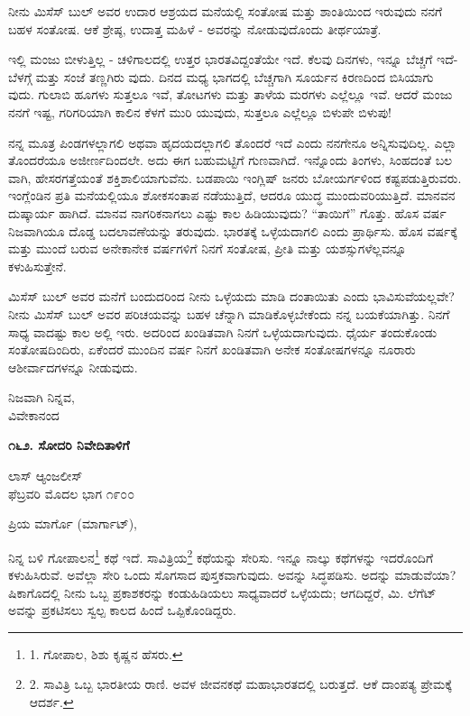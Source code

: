 ನೀನು ಮಿಸೆಸ್ ಬುಲ್ ಅವರ ಉದಾರ ಆಶ್ರಯದ ಮನೆಯಲ್ಲಿ ಸಂತೋಷ ಮತ್ತು ಶಾಂತಿಯಿಂದ ಇರುವುದು ನನಗೆ ಬಹಳ ಸಂತೋಷ. ಆಕೆ ಶ್ರೇಷ್ಠ, ಉದಾತ್ತ ಮಹಿಳೆ - ಅವರನ್ನು ನೋಡುವುದೊಂದು ತೀರ್ಥಯಾತ್ರೆ.

ಇಲ್ಲಿ ಮಂಜು ಬೀಳುತ್ತಿಲ್ಲ - ಚಳಿಗಾಲದಲ್ಲಿ ಉತ್ತರ ಭಾರತವಿದ್ದಂತೆಯೇ ಇದೆ. ಕೆಲವು ದಿನಗಳು, ಇನ್ನೂ ಬೆಚ್ಚಗೆ ಇದೆ-ಬೆಳಗ್ಗೆ ಮತ್ತು ಸಂಜೆ ತಣ್ಣಗಿರು ವುದು. ದಿನದ ಮಧ್ಯ ಭಾಗದಲ್ಲಿ ಬೆಚ್ಚಗಾಗಿ ಸೂರ್ಯನ ಕಿರಣದಿಂದ ಬಿಸಿಯಾಗು ವುದು. ಗುಲಾಬಿ ಹೂಗಳು ಸುತ್ತಲೂ ಇವೆ, ತೋಟಗಳು ಮತ್ತು ತಾಳೆಯ ಮರಗಳು ಎಲ್ಲೆಲ್ಲೂ ಇವೆ. ಆದರೆ ಮಂಜು ನನಗೆ ಇಷ್ಟ, ಗರಿಗರಿಯಾಗಿ ಕಾಲಿನ ಕೆಳಗೆ ಮುರಿ ಯುವುದು, ಸುತ್ತಲೂ ಎಲ್ಲೆಲ್ಲೂ ಬಿಳುಪೇ ಬಿಳುಪು!

ನನ್ನ ಮೂತ್ರ ಪಿಂಡಗಳಲ್ಲಾಗಲಿ ಅಥವಾ ಹೃದಯದಲ್ಲಾಗಲಿ ತೊಂದರೆ ಇದೆ ಎಂದು ನನಗೇನೂ ಅನ್ನಿಸುವುದಿಲ್ಲ. ಎಲ್ಲಾ ತೊಂದರೆಯೂ ಅಜೀರ್ಣದಿಂದಲೇ. ಅದು ಈಗ ಬಹುಮಟ್ಟಿಗೆ ಗುಣವಾಗಿದೆ. ಇನ್ನೊಂದು ತಿಂಗಳು, ಸಿಂಹದಂತೆ ಬಲ ವಾಗಿ, ಹೇಸರಗತ್ತೆಯಂತೆ ಶಕ್ತಿಶಾಲಿಯಾಗುವೆನು. ಬಡಪಾಯಿ ಇಂಗ್ಲಿಷ್ ಜನರು ಬೋಯರ್ಗಳಿಂದ ಕಷ್ಟಪಡುತ್ತಿರುವರು. ಇಂಗ್ಲೆಂಡಿನ ಪ್ರತಿ ಮನೆಯಲ್ಲಿಯೂ ಶೋಕಸಂತಾಪ ನಡೆಯುತ್ತಿದೆ, ಆದರೂ ಯುದ್ಧ ಮುಂದುವರಿಯುತ್ತಿದೆ. ಮಾನವನ ದುಷ್ಕಾರ್ಯ ಹಾಗಿದೆ. ಮಾನವ ನಾಗರಿಕನಾಗಲು ಎಷ್ಟು ಕಾಲ ಹಿಡಿಯುವುದು? “ತಾಯಿಗೆ” ಗೊತ್ತು. ಹೊಸ ವರ್ಷ ನಿಜವಾಗಿಯೂ ದೊಡ್ಡ ಬದಲಾವಣೆಯನ್ನು ತರುವುದು. ಭಾರತಕ್ಕೆ ಒಳ್ಳೆಯದಾಗಲಿ ಎಂದು ಪ್ರಾರ್ಥಿಸು. ಹೊಸ ವರ್ಷಕ್ಕೆ ಮತ್ತು ಮುಂದೆ ಬರುವ ಅನೇಕಾನೇಕ ವರ್ಷಗಳಿಗೆ ನಿನಗೆ ಸಂತೋಷ, ಪ್ರೀತಿ ಮತ್ತು ಯಶಸ್ಸುಗಳೆಲ್ಲವನ್ನೂ ಕಳುಹಿಸುತ್ತೇನೆ.

ಮಿಸೆಸ್ ಬುಲ್ ಅವರ ಮನೆಗೆ ಬಂದುದರಿಂದ ನೀನು ಒಳ್ಳೆಯದು ಮಾಡಿ ದಂತಾಯಿತು ಎಂದು ಭಾವಿಸುವೆಯಲ್ಲವೇ? ನೀನು ಮಿಸೆಸ್ ಬುಲ್ ಅವರ ಪರಿಚಯವನ್ನು ಬಹಳ ಚೆನ್ನಾಗಿ ಮಾಡಿಕೊಳ್ಳಬೇಕೆಂದು ನನ್ನ ಬಯಕೆಯಾಗಿತ್ತು. ನಿನಗೆ ಸಾಧ್ಯ ವಾದಷ್ಟು ಕಾಲ ಅಲ್ಲಿ ಇರು. ಅದರಿಂದ ಖಂಡಿತವಾಗಿ ನಿನಗೆ ಒಳ್ಳೆಯದಾಗುವುದು. ಧೈರ್ಯ ತಂದುಕೊಂಡು ಸಂತೋಷದಿಂದಿರು, ಏಕೆಂದರೆ ಮುಂದಿನ ವರ್ಷ ನಿನಗೆ ಖಂಡಿತವಾಗಿ ಅನೇಕ ಸಂತೋಷಗಳನ್ನೂ ನೂರಾರು ಆಶೀರ್ವಾದಗಳನ್ನೂ ನೀಡುವುದು.

\begin{flushright}
ನಿಜವಾಗಿ ನಿನ್ನವ,\\ವಿವೇಕಾನಂದ
\end{flushright}

\begin{center}
\textbf{೧೬೨. ಸೋದರಿ ನಿವೇದಿತಾಳಿಗೆ}
\end{center}

\begin{flushright}
ಲಾಸ್ ಆ್ಯಂಜಲೀಸ್\\ಫೆಬ್ರವರಿ ಮೊದಲ ಭಾಗ ೧೯೦೦
\end{flushright}

ಪ್ರಿಯ ಮಾರ್ಗೊ (ಮಾರ್ಗಾಟ್),

ನಿನ್ನ ಬಳಿ ಗೋಪಾಲನ\footnote{1. ಗೋಪಾಲ, ಶಿಶು ಕೃಷ್ಣನ ಹೆಸರು.} ಕಥೆ ಇದೆ. ಸಾವಿತ್ರಿಯ\footnote{2. ಸಾವಿತ್ರಿ ಒಬ್ಬ ಭಾರತೀಯ ರಾಣಿ. ಅವಳ ಜೀವನಕಥೆ ಮಹಾಭಾರತದಲ್ಲಿ ಬರುತ್ತದೆ. ಆಕೆ ದಾಂಪತ್ಯ ಪ್ರೇಮಕ್ಕೆ ಆದರ್ಶ.} ಕಥೆಯನ್ನು ಸೇರಿಸು. ಇನ್ನೂ ನಾಲ್ಕು ಕಥೆಗಳನ್ನು ಇದರೊಂದಿಗೆ ಕಳುಹಿಸಿರುವೆ. ಅವೆಲ್ಲಾ ಸೇರಿ ಒಂದು ಸೊಗಸಾದ ಪುಸ್ತಕವಾಗುವುದು. ಅವನ್ನು ಸಿದ್ಧಪಡಿಸು. ಅದನ್ನು ಮಾಡುವೆಯಾ? ಷಿಕಾಗೊದಲ್ಲಿ ನೀನು ಒಬ್ಬ ಪ್ರಕಾಶಕರನ್ನು ಕಂಡುಹಿಡಿಯಲು ಸಾಧ್ಯವಾದರೆ ಒಳ್ಳೆಯದು; ಆಗದಿದ್ದರೆ, ಮಿ. ಲೆಗೆಟ್ ಅವನ್ನು ಪ್ರಕಟಿಸಲು ಸ್ವಲ್ಪ ಕಾಲದ ಹಿಂದೆ ಒಪ್ಪಿಕೊಂಡಿದ್ದರು.

